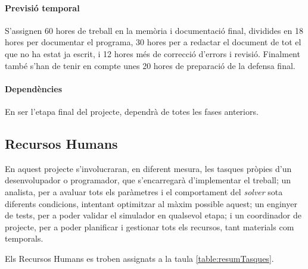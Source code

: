 \documentclass[a4paper]{article} %
\begin{document}
	\paragraph{\quad Previsió temporal} S'assignen 60 hores de treball en la memòria i documentació final, dividides en 18 hores per documentar el programa, 30 hores per a redactar el document de tot el que no ha estat ja escrit, i 12 hores més de correcció d'errors i revisió. Finalment també s'han de tenir en compte unes 20 hores de preparació de la defensa final.
	\paragraph{\quad Dependències} En ser l'etapa final del projecte, dependrà de totes les fases anteriors.
	
	\subsection{Recursos Humans}
	En aquest projecte s'involucraran, en diferent mesura, les tasques pròpies d'un desenvolupador o programador, que s'encarregarà d'implementar el treball; un analista, per a avaluar tots els paràmetres i el comportament del \textit{solver} sota diferents condicions, intentant optimitzar al màxim possible aquest; un enginyer de tests, per a poder validar el simulador en qualsevol etapa; i un coordinador de projecte, per a poder planificar i gestionar tots els recursos, tant materials com temporals.
	\par
	Els Recursos Humans es troben assignats a la taula \ref{table:resumTasques}.
	\newpage
\end{document}
